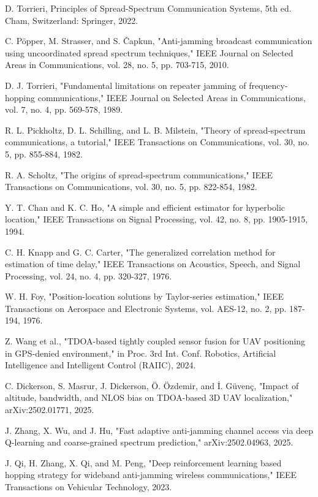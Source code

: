  D. Torrieri, Principles of Spread-Spectrum Communication Systems, 5th ed. Cham, Switzerland: Springer, 2022.

 C. Pöpper, M. Strasser, and S. \v{C}apkun, "Anti-jamming broadcast communication using uncoordinated spread spectrum techniques," IEEE Journal on Selected Areas in Communications, vol. 28, no. 5, pp. 703-715, 2010.

 D. J. Torrieri, "Fundamental limitations on repeater jamming of frequency-hopping communications," IEEE Journal on Selected Areas in Communications, vol. 7, no. 4, pp. 569-578, 1989.

 R. L. Pickholtz, D. L. Schilling, and L. B. Milstein, "Theory of spread-spectrum communications, a tutorial," IEEE Transactions on Communications, vol. 30, no. 5, pp. 855-884, 1982.

 R. A. Scholtz, "The origins of spread-spectrum communications," IEEE Transactions on Communications, vol. 30, no. 5, pp. 822-854, 1982.

 Y. T. Chan and K. C. Ho, "A simple and efficient estimator for hyperbolic location," IEEE Transactions on Signal Processing, vol. 42, no. 8, pp. 1905-1915, 1994.

 C. H. Knapp and G. C. Carter, "The generalized correlation method for estimation of time delay," IEEE Transactions on Acoustics, Speech, and Signal Processing, vol. 24, no. 4, pp. 320-327, 1976.

 W. H. Foy, "Position-location solutions by Taylor-series estimation," IEEE Transactions on Aerospace and Electronic Systems, vol. AES-12, no. 2, pp. 187-194, 1976.

 Z. Wang et al., "TDOA-based tightly coupled sensor fusion for UAV positioning in GPS-denied environment," in Proc. 3rd Int. Conf. Robotics, Artificial Intelligence and Intelligent Control (RAIIC), 2024.

 C. Dickerson, S. Masrur, J. Dickerson, Ö. Özdemir, and \.{I}. Güvenç, "Impact of altitude, bandwidth, and NLOS bias on TDOA-based 3D UAV localization," arXiv:2502.01771, 2025.

 J. Zhang, X. Wu, and J. Hu, "Fast adaptive anti-jamming channel access via deep Q-learning and coarse-grained spectrum prediction," arXiv:2502.04963, 2025.

 J. Qi, H. Zhang, X. Qi, and M. Peng, "Deep reinforcement learning based hopping strategy for wideband anti-jamming wireless communications," IEEE Transactions on Vehicular Technology, 2023.

